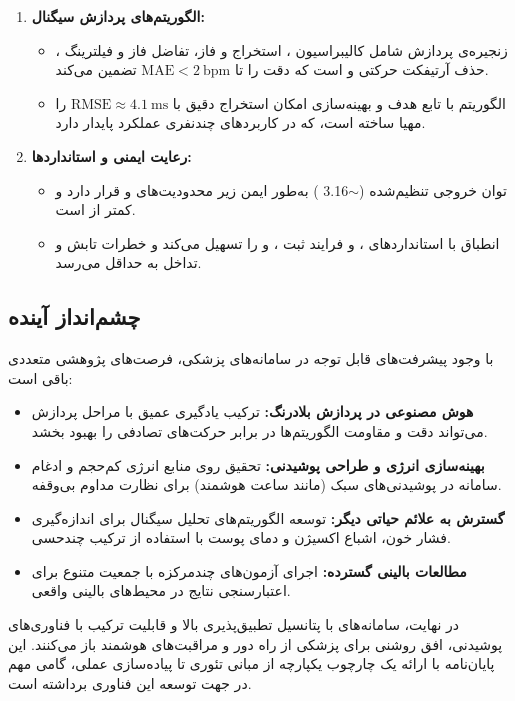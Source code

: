 \begin{enumerate}
    \item \textbf{الگوریتم‌های پردازش سیگنال:}
    \begin{itemize}
        \item زنجیره‌ی پردازش شامل کالیبراسیون ، استخراج و  فاز، تفاضل فاز و فیلترینگ ، حذف آرتیفکت حرکتی و  است که دقت  را تا $\mathrm{MAE} < 2\ \mathrm{bpm}$ تضمین می‌کند.
        \item الگوریتم  با تابع هدف  و بهینه‌سازی  امکان استخراج دقیق  با $\mathrm{RMSE} \approx 4.1\ \mathrm{ms}$ را مهیا ساخته است، که در کاربردهای چندنفری عملکرد پایدار دارد.
    \end{itemize}

    \item \textbf{رعایت ایمنی و استانداردها:}
    \begin{itemize}
        \item توان خروجی تنظیم‌شده ($\sim$3.16 ) به‌طور ایمن زیر محدودیت‌های  و  قرار دارد و  کمتر از  است.
        \item انطباق با استانداردهای ،  و  فرایند ثبت ،  و  را تسهیل می‌کند و خطرات تابش و تداخل به حداقل می‌رسد.
    \end{itemize}
\end{enumerate}

\subsection*{چشم‌انداز آینده}
\label{sec:future-work}

با وجود پیشرفت‌های قابل توجه در سامانه‌های  پزشکی، فرصت‌های پژوهشی متعددی باقی است:

\begin{itemize}
    \item \textbf{هوش مصنوعی در پردازش بلادرنگ:} ترکیب یادگیری عمیق با مراحل پردازش می‌تواند دقت و مقاومت الگوریتم‌ها در برابر حرکت‌های تصادفی را بهبود بخشد.
    \item \textbf{بهینه‌سازی انرژی و طراحی پوشیدنی:} تحقیق روی منابع انرژی کم‌حجم و ادغام سامانه در پوشیدنی‌های سبک (مانند ساعت هوشمند) برای نظارت مداوم بی‌وقفه.
    \item \textbf{گسترش به علائم حیاتی دیگر:} توسعه الگوریتم‌های تحلیل سیگنال برای اندازه‌گیری فشار خون، اشباع اکسیژن و دمای پوست با استفاده از ترکیب چندحسی.
    \item \textbf{مطالعات بالینی گسترده:} اجرای آزمون‌های چندمرکزه با جمعیت متنوع برای اعتبارسنجی نتایج در محیط‌های بالینی واقعی.
\end{itemize}

در نهایت، سامانه‌های  با پتانسیل تطبیق‌پذیری بالا و قابلیت ترکیب با فناوری‌های پوشیدنی، افق روشنی برای پزشکی از راه دور و مراقبت‌های هوشمند باز می‌کنند. این پایان‌نامه با ارائه یک چارچوب یکپارچه از مبانی تئوری تا پیاده‌سازی عملی، گامی مهم در جهت توسعه این فناوری برداشته است.

